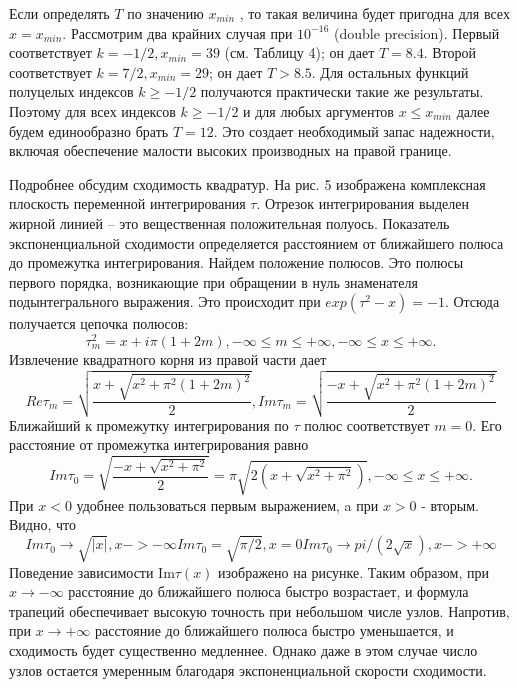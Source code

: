 Если определять $T$ по значению $x_{min}$ , то такая величина будет пригодна
для всех $x = x_{min}$. Рассмотрим два крайних случая при $10^{-16}$ (double
precision). Первый соответствует $k = -1/2, x_{min} = 39$ (см. Таблицу 4); он дает
$T = 8.4$. Второй соответствует $k = 7/2, x_{min} = 29$; он дает $T > 8.5$. Для
остальных функций полуцелых индексов $k \geqslant -1/2$ получаются практически
такие же результаты. Поэтому для всех индексов $k \geqslant -1/2$ и для любых
аргументов $x \leqslant x_{min}$ далее будем единообразно брать $T=12$. Это создает
необходимый запас надежности, включая обеспечение малости высоких
производных на правой границе.

Подробнее обсудим сходимость квадратур. На рис. 5 изображена
комплексная плоскость переменной интегрирования $\tau$. Отрезок
интегрирования выделен жирной линией – это вещественная положительная
полуось. Показатель экспоненциальной сходимости определяется расстоянием
от ближайшего полюса до промежутка интегрирования. Найдем положение полюсов. Это полюсы первого порядка, возникающие при обращении в нуль знаменателя подынтегрального выражения. Это происходит при $exp(\tau^2 -x) = -1$. Отсюда получается цепочка полюсов:
\begin{equation}
\tau_m^2 = x + i\pi(1+2m), -\infty \leqslant m \leqslant +\infty, -\infty \leqslant x \leqslant +\infty.
\end{equation}
Извлечение квадратного корня из правой части дает
\begin{equation}
Re \tau_m = \sqrt{\frac{x+\sqrt{x^2 + \pi^2(1+2m)^2}}{2}},
Im \tau_m = \sqrt{\frac{-x+\sqrt{x^2 + \pi^2(1+2m)^2}}{2}}
\end{equation}
Ближайший к промежутку интегрирования по $\tau$ полюс соответствует $m=0$. Его расстояние от промежутка интегрирования равно
\begin{equation}
Im \tau_0 = \sqrt{\frac{-x+\sqrt{x^2 + \pi^2}}{2}} = \pi \sqrt{2(x+\sqrt{x^2+\pi^2})}, -\infty \leqslant x \leqslant +\infty.
\end{equation}
При $x < 0$ удобнее пользоваться первым выражением, a при $x>0$ - вторым. Видно, что 
\begin{equation}
Im \tau_0 \to \sqrt{|x|}, x->-\infty
Im \tau_0 = \sqrt{\pi / 2}, x=0
Im \tau_0 \to  pi /(2\sqrt{x}), x->+\infty
\end{equation}
Поведение зависимости Im$\tau(x)$ изображено на рисунке. %
Таким образом, при $x \to -\infty$ расстояние до ближайшего полюса быстро возрастает, и формула трапеций обеспечивает высокую точность при небольшом числе узлов. Напротив, при $x \to +\infty$ расстояние до ближайшего полюса быстро уменьшается, и сходимость будет существенно медленнее. Однако даже в этом случае число узлов остается умеренным благодаря экспоненциальной скорости сходимости.


